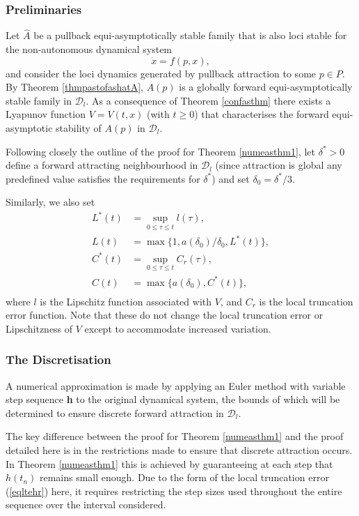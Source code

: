 \subsubsection{Preliminaries}

Let $\hat{A}$ be a pullback equi-asymptotically stable family that is also loci
stable for the non-autonomous dynamical system
\[ \dot{x} = f(p,x), \]
and consider the loci dynamics generated by pullback attraction to some $p \in
P$. By Theorem \ref{thmpastofashatA}, $A(p)$ is a globally forward
equi-asymptotically stable family in $\mathcal{D}_l$. As a consequence of
Theorem \ref{confasthm} there exists a Lyapunov function $V=V(t,x)$ (with $t
\geq 0$) that characterises the forward equi-asymptotic stability of $A(p)$ in
$\mathcal{D}_l$.

Following closely the outline of the proof for Theorem \ref{numeasthm1}, let
$\delta^* > 0$ define a forward attracting neighbourhood in $\mathcal{D}_l$
(since attraction is global any predefined value satisfies the requirements
for $\delta^*$) and set $\delta_0 = \delta^*/3$.

Similarly, we also set
\begin{align*}
  L^*(t) &= \sup_{0 \leq \tau \leq t} l(\tau), \\
  L(t) &= \max \{1, a(\delta_0)/\delta_0, L^*(t) \}, \\
  C^*(t) &= \sup_{0 \leq \tau \leq t} C_r(\tau), \\
  C(t) &= \max \{a(\delta_0), C^*(t) \}, \\
\end{align*}
where $l$ is the Lipschitz function associated with $V$, and $C_r$
is the local truncation error function. Note that these do not
change the local truncation error or Lipschitzness of $V$ except
to accommodate increased variation.

\subsubsection{The Discretisation}

A numerical approximation is made by applying an Euler method with variable
step sequence {\bf h} to the original dynamical system, the bounds of which
will be determined to ensure discrete forward attraction in $\mathcal{D}_l$.

The key difference between the proof for Theorem \ref{numeasthm1} and the proof
detailed here is in the restrictions made to ensure that discrete
attraction occurs.  In Theorem \ref{numeasthm1} this is achieved
by guaranteeing at each step  that $h(t_n)$ remains small enough. Due to the
form of the local truncation error (\ref{eqltehr}) here, it requires restricting
the step sizes used throughout the entire sequence over the interval considered.

